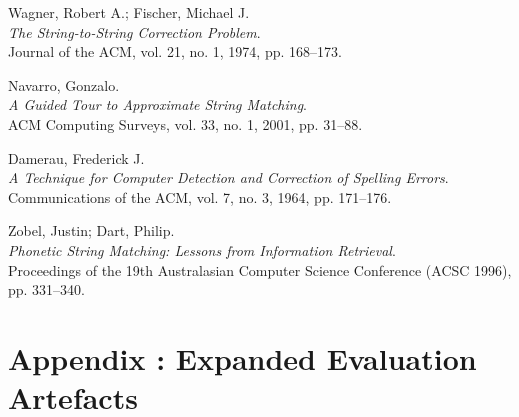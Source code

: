 \documentclass[12pt]{article}
\newif\ifskipsectionclear
\begin{document}
\begin{thebibliography}{9}
Wagner, Robert A.; Fischer, Michael J.\\
\textit{The String-to-String Correction Problem}.\\
Journal of the ACM, vol. 21, no. 1, 1974, pp. 168--173.

Navarro, Gonzalo.\\
\textit{A Guided Tour to Approximate String Matching}.\\
ACM Computing Surveys, vol. 33, no. 1, 2001, pp. 31--88.

Damerau, Frederick J.\\
\textit{A Technique for Computer Detection and Correction of Spelling Errors}.\\
Communications of the ACM, vol. 7, no. 3, 1964, pp. 171--176.

Zobel, Justin; Dart, Philip.\\
\textit{Phonetic String Matching: Lessons from Information Retrieval}.\\
Proceedings of the 19th Australasian Computer Science Conference (ACSC 1996), pp. 331--340.

\end{thebibliography}



\cleardoublepage
\skipsectioncleartrue
{}
\setcounter{page}{1}
\appendix

\section{Appendix \thesection: Expanded Evaluation Artefacts}

\begin{table}[H]
    \centering
    \footnotesize
    \caption{Hold-out test aggregates (20 seeds) for trained detectors. Percentages report mean $\pm$ standard deviation across seeds; counts are means.}
    \label{tab:appendix-holdout-aggregates}
\end{table}
\end{document}
